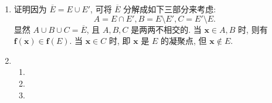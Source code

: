 \documentclass[a4paper, 11pt]{ctexart}
\begin{document}
\begin{enumerate}
    \item %
        {\heiti 证明}\quad 因为 $\overline{E} = E \cup E'$, 可将 $\overline{E}$ 分解成如下三部分来考虑:
        \[
            A = E \cap E', B = E \setminus E', C = E' \setminus E.    
        \]
        显然 $A \cup B \cup C = \overline{E}$, 且 $A, B, C$ 是两两不相交的. 当 $\boldsymbol{x} \in A, B$ 时, 则有 $\boldsymbol{f}(\boldsymbol{x}) \in \boldsymbol{f}(E)$.
        当 $\boldsymbol{x} \in C$ 时, 即 $\boldsymbol{x}$ 是 $E$ 的凝聚点, 但 $\boldsymbol{x} \notin E$. 
    \item %
        \begin{enumerate}
            \item %
            \item %
            \item %
        \end{enumerate}
\end{enumerate}
\end{document}
